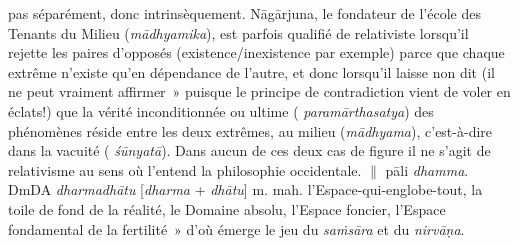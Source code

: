 \documentclass[a4paper,11pt,twocolumn]{article}
\begin{document}
pas séparément, donc intrinsèquement. N\={a}g\={a}rjuna, le fondateur
de l'école des Tenants du Milieu ({\em m\={a}dhyamika}), est parfois
qualifié de relativiste lorsqu'il rejette les paires d'opposés
(existence/inexistence par exemple) parce que chaque extrême n'existe
qu'en dépendance de l'autre, et donc lorsqu'il laisse non dit (il ne
peut vraiment \og affirmer~» puisque le principe de contradiction vient
de voler en éclats!) que la vérité inconditionnée ou ultime ({\em
param\={a}rthasatya}) des phénomènes réside entre les deux extrêmes,
au milieu ({\em m\={a}dhyama}), c'est-à-dire dans la vacuité ({\em
\'{s}\={u}nyat\={a}}). Dans aucun de ces deux cas de figure il ne
s'agit de relativisme au sens où l'entend la philosophie
occidentale. $\|$ p\={a}li {\em dhamma}. \\

{\dn Dm\0DA} {\em dharmadh\={a}tu} [{\em dharma} + {\em
dh\={a}tu}] m. mah. \og l'Espace-qui-englobe-tout\fg, la toile de fond
de la réalité\fg, le Domaine absolu, l'Espace foncier, l'Espace
fondamental de la fertilité~» d'où émerge le jeu du {\em
sa\.{m}s\={a}ra} et du {\em nirv\={a}\d{n}a}. \\
\end{document}

